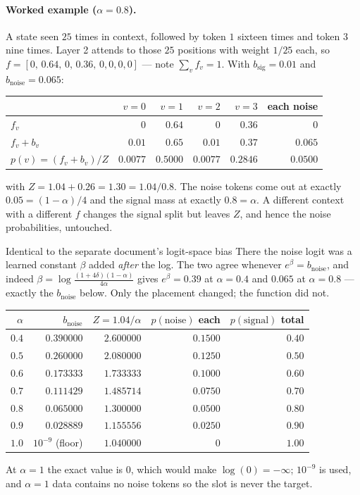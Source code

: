 \documentclass[11pt]{article}
\begin{document}
\paragraph{Worked example ($\alpha=0.8$).} A state seen $25$ times in context, followed by token
$1$ sixteen times and token $3$ nine times. Layer 2 attends to those $25$ positions with weight
$1/25$ each, so $f=[0,\,0.64,\,0,\,0.36,\,0,0,0,0]$ --- note $\sum_v f_v=1$. With
$b_{\mathrm{sig}}=0.01$ and $b_{\mathrm{noise}}=0.065$:
\begin{center}
\begin{tabular}{@{}lrrrrr@{}}
\toprule
& $v=0$ & $v=1$ & $v=2$ & $v=3$ & each noise\\
\midrule
$f_v$          & $0$ & $0.64$ & $0$ & $0.36$ & $0$\\
$f_v+b_v$      & $0.01$ & $0.65$ & $0.01$ & $0.37$ & $0.065$\\
$p(v)=(f_v+b_v)/Z$ & $0.0077$ & $0.5000$ & $0.0077$ & $0.2846$ & $0.0500$\\
\bottomrule
\end{tabular}
\end{center}
with $Z=1.04+0.26=1.30=1.04/0.8$. The noise tokens come out at exactly $0.05=(1-\alpha)/4$ and
the signal mass at exactly $0.8=\alpha$. A different context with a different $f$ changes the
signal split but leaves $Z$, and hence the noise probabilities, untouched.

\begin{notebox}{Identical to the separate document's logit-space bias}
There the noise logit was a learned constant $\beta$ added \emph{after} the log. The two agree
whenever $e^{\beta}=b_{\mathrm{noise}}$, and indeed
$\beta=\log\frac{(1+4\delta)(1-\alpha)}{4\alpha}$ gives $e^{\beta}=0.39$ at $\alpha=0.4$ and
$0.065$ at $\alpha=0.8$ --- exactly the $b_{\mathrm{noise}}$ below. Only the placement changed;
the function did not.
\end{notebox}

\begin{center}
\begin{tabular}{@{}rrrrr@{}}
\toprule
$\alpha$ & $b_{\mathrm{noise}}$ & $Z=1.04/\alpha$ & $p(\text{noise})$ each & $p(\text{signal})$ total\\
\midrule
$0.4$ & $0.390000$ & $2.600000$ & $0.1500$ & $0.40$\\
$0.5$ & $0.260000$ & $2.080000$ & $0.1250$ & $0.50$\\
$0.6$ & $0.173333$ & $1.733333$ & $0.1000$ & $0.60$\\
$0.7$ & $0.111429$ & $1.485714$ & $0.0750$ & $0.70$\\
$0.8$ & $0.065000$ & $1.300000$ & $0.0500$ & $0.80$\\
$0.9$ & $0.028889$ & $1.155556$ & $0.0250$ & $0.90$\\
$1.0$ & $10^{-9}$ (floor) & $1.040000$ & $0$ & $1.00$\\
\bottomrule
\end{tabular}
\end{center}
At $\alpha=1$ the exact value is $0$, which would make $\log(0)=-\infty$; $10^{-9}$ is used, and
$\alpha=1$ data contains no noise tokens so the slot is never the target.
\end{document}
